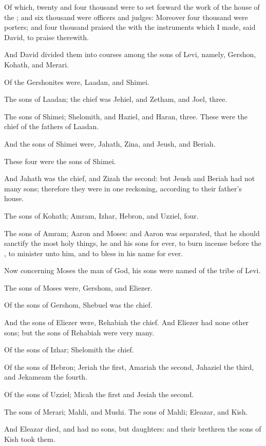 \Verse Of which, twenty and four thousand were to set forward the work of the house of the \LORD; and six thousand were officers and judges: \Verse Moreover four thousand were porters; and four thousand praised the \LORD with the instruments which I made, said David, to praise therewith.

\Verse And David divided them into courses among the sons of Levi, namely, Gershon, Kohath, and Merari.

\Verse Of the Gershonites were, Laadan, and Shimei.

\Verse The sons of Laadan; the chief was Jehiel, and Zetham, and Joel, three.

\Verse The sons of Shimei; Shelomith, and Haziel, and Haran, three.  These were the chief of the fathers of Laadan.

\Verse And the sons of Shimei were, Jahath, Zina, and Jeush, and Beriah.

These four were the sons of Shimei.

\Verse And Jahath was the chief, and Zizah the second: but Jeush and Beriah had not many sons; therefore they were in one reckoning, according to their father's house.

\Verse The sons of Kohath; Amram, Izhar, Hebron, and Uzziel, four.

\Verse The sons of Amram; Aaron and Moses: and Aaron was separated, that he should sanctify the most holy things, he and his sons for ever, to burn incense before the \LORD, to minister unto him, and to bless in his name for ever.

\Verse Now concerning Moses the man of God, his sons were named of the tribe of Levi.

\Verse The sons of Moses were, Gershom, and Eliezer.

\Verse Of the sons of Gershom, Shebuel was the chief.

\Verse And the sons of Eliezer were, Rehabiah the chief. And Eliezer had none other sons; but the sons of Rehabiah were very many.

\Verse Of the sons of Izhar; Shelomith the chief.

\Verse Of the sons of Hebron; Jeriah the first, Amariah the second, Jahaziel the third, and Jekameam the fourth.

\Verse Of the sons of Uzziel; Micah the first and Jesiah the second.

\Verse The sons of Merari; Mahli, and Mushi. The sons of Mahli; Eleazar, and Kish.

\Verse And Eleazar died, and had no sons, but daughters: and their brethren the sons of Kish took them.

